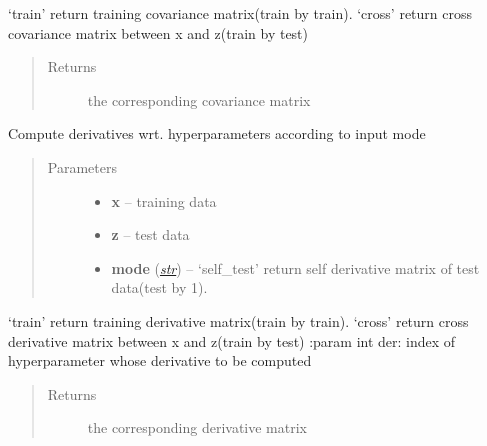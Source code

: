 \documentclass[letterpaper,10pt,english]{sphinxmanual}
\begin{document}
\begin{fulllineitems}
\begin{fulllineitems}
\begin{quote}
\begin{description}
\end{description}\end{quote}

`train' return training covariance matrix(train by train).
`cross' return cross covariance matrix between x and z(train by test)
\begin{quote}\begin{description}
\item[{Returns}] \leavevmode
the corresponding covariance matrix

\end{description}\end{quote}

\end{fulllineitems}


\begin{fulllineitems}
\label{pyGPs.Core:pyGPs.Core.cov.Kernel.getDerMatrix}
Compute derivatives wrt. hyperparameters according to input mode
\begin{quote}\begin{description}
\item[{Parameters}] \leavevmode\begin{itemize}
\item {} 
\textbf{x} -- training data

\item {} 
\textbf{z} -- test data

\item {} 
\textbf{mode} (\href{http://docs.python.org/library/functions.html\#str}{\emph{str}}) -- `self\_test' return self derivative matrix of test data(test by 1).

\end{itemize}

\end{description}\end{quote}

`train' return training derivative matrix(train by train).
`cross' return cross derivative matrix between x and z(train by test)
:param int der: index of hyperparameter whose derivative to be computed
\begin{quote}\begin{description}
\item[{Returns}] \leavevmode
the corresponding derivative matrix


\end{description}
\end{quote}
\end{fulllineitems}
\end{fulllineitems}
\end{document}
